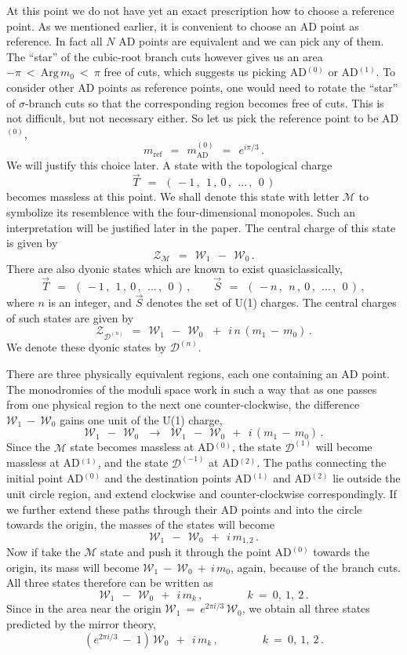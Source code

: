 \documentclass[epsfig,12pt]{article}
\def\beq{\begin{equation}}
\def\eeq{\end{equation}}
\def\beq{\begin{equation}}
\def\eeq{\end{equation}}
\newcommand{\mc}[1]{\mathcal{#1}}
\newcommand{\W}{\mathcal{W}}
\newcommand{\M}{\mathcal{M}}
\newcommand{\D}{\mathcal{D}}
\begin{document}
	At this point we do not have yet an exact prescription how to choose a reference point.
	As we mentioned earlier, it is convenient to choose an AD point as reference.
	In fact all $ N $ AD points are equivalent and we can pick any of them.
	The ``star'' of the cubic-root branch cuts however gives us 
	an area $  -\pi ~<~ \text{Arg}\, m_0 ~<~ \pi $ free of cuts,
	which suggests us picking AD$^{(0)}$ or AD$^{(1)}$.
	To consider other AD points as reference points, 
	one would need to rotate the ``star'' of $\sigma$-branch cuts so that the corresponding region becomes
	free of cuts.
	This is not difficult, but not necessary either.
	So let us pick the reference point to be AD$^{(0)}$, 
\beq
	m_\text{ref} ~~=~~ m_\text{AD}^{(0)} ~~=~~ e^{i \pi / 3}\,.
\eeq
	We will justify this choice later.
	A state with the topological charge
\beq
	\vec{T} ~~=~~ (\, -1\,,~~ 1\,,~ 0 \,,~~ ...\,,~~ 0 \,)
\eeq
	becomes massless at this point.
	We shall denote this state with letter $ \mc{M} $ to symbolize its resemblence with 
	the four-dimensional monopoles. 
	Such an interpretation will be justified later in the paper.
	The central charge of this state is given by
\beq
\label{ZM}
	\mc{Z_M} ~~=~~ \W_1 ~~-~~ \W_0\,.
\eeq
	There are also dyonic states which are known to exist quasiclassically,
\beq
	\vec{T} ~~=~~ (\, -1\,,~~ 1\,,~ 0 \,,~~ ...\,,~~ 0 \,)\,, \qquad
	\vec{S} ~~=~~ (\, -n\,,~~ n\,,~ 0 \,,~~ ...\,,~~ 0 \,)\,, 
\eeq
	where $ n $ is an integer, and $ \vec{S} $ denotes the set of U(1) charges.
	The central charges of such states are given by 
\beq
	\mc{Z}_{\mc{D}^{(n)}} ~~=~~ \W_1 ~~-~~ \W_0\, ~~+~~ i\, n\, ( m_1 \,-\, m_0 ) \,.
\eeq
	We denote these dyonic states by $ \mc{D}^{(n)} $.

	There are three physically equivalent regions, each one containing an AD point.
	The monodromies of the moduli space work in such a way that as one passes from 
	one physical region to the next one counter-clockwise, the difference 
$ \W_1 ~-~ \W_0 $
	gains one unit of the U(1) charge,
\beq
	\W_1 ~~-~~ \W_0  ~~~\to~~~ \W_1 ~~-~~ \W_0 ~~+~~ i\,( m_1 \,-\, m_0 ) \,.
\eeq
	Since the $ \M $ state becomes massless at AD$^{(0)}$, the state $ \D^{(1)} $ will become
	massless at AD$^{(1)}$, and the state $ \D^{(-1)} $ at AD$^{(2)}$.
	The paths connecting the initial point AD$^{(0)}$ and the destination points AD$^{(1)}$ and AD$^{(2)}$
	lie outside the unit circle region, and 
	extend clockwise and counter-clockwise correspondingly.
	If we further extend these paths through their AD points and into the circle towards the origin,
	the masses of the states will become
\beq
	\W_1 ~~-~~ \W_0 ~~+~~ i\, m_{1,2}\,.
\eeq
	Now if take the $ \M $ state and push it through the point AD$^{(0)}$ towards the origin,
	its mass will become $ \W_1 ~-~ \W_0 ~+~ i\,m_0 $, again, because of the branch cuts.
	All three states therefore can be written as
\beq
	\W_1 ~~-~~ \W_0 ~~+~~ i\, m_k\,,\qquad\qquad k~=~ 0,~1,~2\,.
\eeq
	Since in the area near the origin $ \W_1 ~=~ e^{2 \pi i / 3}\, \W_0 $, we obtain all three states 
	predicted by the mirror theory,
\beq
	(e^{2 \pi i /3} ~-~ 1)\, \W_0 ~~+~~ i\, m_k\,,\qquad\qquad k~=~ 0,~1,~2\,.
\eeq
\end{document}
